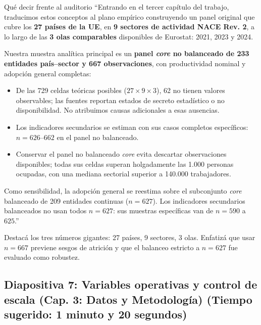 \documentclass[11pt,a4paper]{article}
\begin{document}
\begin{speechbox}{Qué decir frente al auditorio}
``Entrando en el tercer capítulo del trabajo, traducimos estos conceptos al plano empírico construyendo un panel original que cubre los \textbf{27 países de la UE}, en \textbf{9 sectores de actividad NACE Rev. 2}, a lo largo de las \textbf{3 olas comparables} disponibles de Eurostat: 2021, 2023 y 2024.

Nuestra muestra analítica principal es un \textbf{panel \textit{core} no balanceado de 233 entidades país--sector y 667 observaciones}, con productividad nominal y adopción general completas:
\begin{itemize}[itemsep=0.15em]
  \item De las 729 celdas teóricas posibles ($27 \times 9 \times 3$), 62 no tienen valores observables; las fuentes reportan estados de secreto estadístico o no disponibilidad. No atribuimos causas adicionales a esas ausencias.
  \item Los indicadores secundarios se estiman con sus casos completos específicos: $n=626\text{--}662$ en el panel no balanceado.
  \item Conservar el panel no balanceado \textit{core} evita descartar observaciones disponibles; todas sus celdas superan holgadamente las 1.000 personas ocupadas, con una mediana sectorial superior a 140.000 trabajadores.
\end{itemize}

Como sensibilidad, la adopción general se reestima sobre el subconjunto \textit{core} balanceado de 209 entidades continuas ($n=627$). Los indicadores secundarios balanceados no usan todos $n=627$: sus muestras específicas van de $n=590$ a $625$.''
\end{speechbox}

\begin{tipbox}
Destacá los tres números gigantes: 27 países, 9 sectores, 3 olas. Enfatizá que usar $n=667$ previene sesgos de atrición y que el balanceo estricto a $n=627$ fue evaluado como robustez.
\end{tipbox}

\subsection*{Diapositiva 7: Variables operativas y control de escala (Cap. 3: Datos y Metodología) (Tiempo sugerido: 1 minuto y 20 segundos)}
\end{document}
